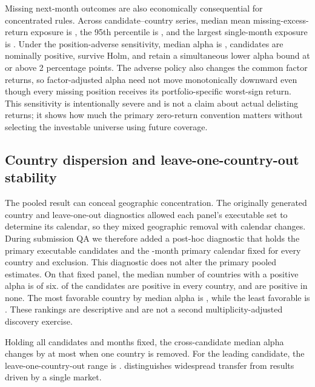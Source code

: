\documentclass[11pt]{article}
\begin{document}
Missing next-month outcomes are also economically consequential for concentrated rules. Across candidate--country series, median mean missing-excess-return exposure is \MedianMissingExposure{}, the 95th percentile is \MissingExposurePninetyfive{}, and the largest single-month exposure is \MaxMissingExposure{}. Under the position-adverse sensitivity, median alpha is \AdverseMedianAlphaPct{}, \AdverseNominalPositiveCount{} candidates are nominally positive, \AdverseHolmPositiveCount{} survive Holm, and \AdverseEconomicConfirmedCount{} retain a simultaneous lower alpha bound at or above 2 percentage points. The adverse policy also changes the common factor returns, so factor-adjusted alpha need not move monotonically downward even though every missing position receives its portfolio-specific worst-sign return. This sensitivity is intentionally severe and is not a claim about actual delisting returns; it shows how much the primary zero-return convention matters without selecting the investable universe using future coverage.

\subsection{Country dispersion and leave-one-country-out stability}

The pooled result can conceal geographic concentration. The originally generated country and leave-one-out diagnostics allowed each panel's executable set to determine its calendar, so they mixed geographic removal with calendar changes. During submission QA we therefore added a post-hoc diagnostic that holds the \ValidProxyCount{} primary executable candidates and the \RegressionMonthCount{}-month primary calendar fixed for every country and exclusion. This diagnostic does not alter the primary pooled estimates. On that fixed panel, the median number of countries with a positive alpha is \MedianPositiveCountries{} of six. \AllCountryPositiveCount{} of the \ValidProxyCount{} candidates are positive in every country, and \NoCountryPositiveCount{} are positive in none. The most favorable country by median alpha is \BestCountry{}, while the least favorable is \WorstCountry{}. These rankings are descriptive and are not a second multiplicity-adjusted discovery exercise.

Holding all \ValidProxyCount{} candidates and \RegressionMonthCount{} months fixed, the cross-candidate median alpha changes by at most \MaxLeaveOneOutMedianShiftPct{} when one country is removed. For the leading candidate, the leave-one-country-out range is \BestCandidateLooRangePct{}.  distinguishes widespread transfer from results driven by a single market.
\end{document}
